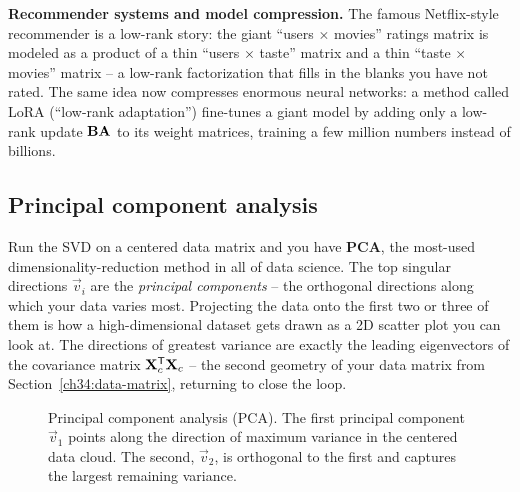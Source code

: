 \begin{applicationbox}
\textbf{Recommender systems and model compression.} The famous Netflix-style
recommender is a low-rank story: the giant ``users $\times$ movies'' ratings matrix is
modeled as a product of a thin ``users $\times$ taste'' matrix and a thin ``taste
$\times$ movies'' matrix -- a low-rank factorization that fills in the blanks you have
not rated. The same idea now compresses enormous neural networks: a method called LoRA
(``low-rank adaptation'') fine-tunes a giant model by adding only a low-rank update
$\mathbf{B}\mathbf{A}$ to its weight matrices, training a few million numbers instead of
billions.
\end{applicationbox}

\subsection{Principal component analysis}

Run the SVD on a centered data matrix and you have \textbf{PCA}, the most-used
dimensionality-reduction method in all of data science. The top singular directions
$\vec{v}_i$ are the \emph{principal components} -- the orthogonal directions along which
your data varies most. Projecting the data onto the first two or three of them is how a
high-dimensional dataset gets drawn as a 2D scatter plot you can look at. The
directions of greatest variance are exactly the leading eigenvectors of the covariance
matrix $\mathbf{X}_c^{\mathsf{T}}\mathbf{X}_c$ -- the second geometry of your data matrix from
Section~\ref{ch34:data-matrix}, returning to close the loop.

\begin{figure}[htbp]
\centering
{}
\caption{Principal component analysis (PCA). The first principal component $\vec{v}_1$ points along the direction of maximum variance in the centered data cloud. The second, $\vec{v}_2$, is orthogonal to the first and captures the largest remaining variance.}
\label{ch34:fig-pca}
\end{figure}

